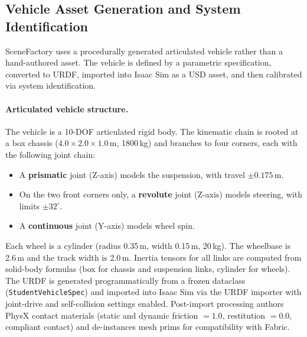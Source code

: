 \subsection{Vehicle Asset Generation and System Identification}
\label{sec:vehicle_sysid}

SceneFactory uses a procedurally generated articulated vehicle rather than a hand-authored asset.
The vehicle is defined by a parametric specification, converted to URDF, imported into Isaac Sim as a USD asset, and then calibrated via system identification.

\paragraph{Articulated vehicle structure.}
The vehicle is a 10-DOF articulated rigid body.
The kinematic chain is rooted at a box chassis ($4.0 \times 2.0 \times 1.0$\,m, 1800\,kg) and branches to four corners, each with the following joint chain:
%
\begin{itemize}[leftmargin=*, itemsep=1pt]
  \item A \textbf{prismatic} joint (Z-axis) models the suspension, with travel $\pm0.175$\,m.
  \item On the two front corners only, a \textbf{revolute} joint (Z-axis) models steering, with limits $\pm32^{\circ}$.
  \item A \textbf{continuous} joint (Y-axis) models wheel spin.
\end{itemize}
%
Each wheel is a cylinder (radius 0.35\,m, width 0.15\,m, 20\,kg).
The wheelbase is 2.6\,m and the track width is 2.0\,m.
Inertia tensors for all links are computed from solid-body formulas (box for chassis and suspension links, cylinder for wheels).
The URDF is generated programmatically from a frozen dataclass (\texttt{StudentVehicleSpec}) and imported into Isaac Sim via the URDF importer with joint-drive and self-collision settings enabled.
Post-import processing authors PhysX contact materials (static and dynamic friction $= 1.0$, restitution $= 0.0$, compliant contact) and de-instances mesh prims for compatibility with Fabric.

